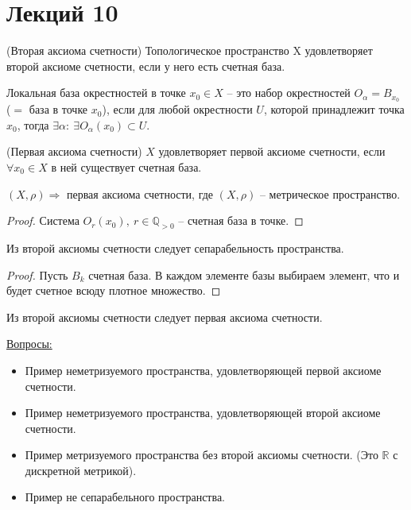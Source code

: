 \section{Лекций 10}

\begin{definition}
    (Вторая аксиома счетности) Топологическое пространство X удовлетворяет второй аксиоме счетности, если у него есть счетная база.
\end{definition}

\begin{definition}
    Локальная база окрестностей в точке $x_0 \in X$ -- это набор окрестностей $O_\alpha = B_{x_0}$ ($=$ база в точке $x_0$), если для любой окрестности $U$, которой принадлежит точка $x_0$, тогда $\exists \alpha:\ \exists O_\alpha(x_0) \subset U$.  
\end{definition}

\begin{definition}
    (Первая аксиома счетности) $X$ удовлетворяет первой аксиоме счетности, если $\forall x_0 \in X$ в ней существует счетная база.
\end{definition}

\begin{statement}
    $(X, \rho) \Rightarrow$ первая аксиома счетности, где $(X, \rho)$ -- метрическое пространство. 
\end{statement}
\begin{proof}
    Система $O_r(x_0),\ r \in \mathbb{Q}_{>0}$ -- счетная база в точке. 
\end{proof}

\begin{statement}
    Из второй аксиомы счетности следует сепарабельность пространства.
\end{statement}
\begin{proof}
    Пусть $B_k$ счетная база. В каждом элементе базы выбираем элемент, что и будет счетное всюду плотное множество. 
\end{proof}

\begin{statement}
    Из второй аксиомы счетности следует первая аксиома счетности.
\end{statement}

\underline{Вопросы:}
\begin{itemize}
    \item Пример неметризуемого пространства, удовлетворяющей первой аксиоме счетности.
    \item Пример неметризуемого пространства, удовлетворяющей второй аксиоме счетности.
    \item Пример метризуемого пространства без второй аксиомы счетности. (Это $\mathbb{R}$ с дискретной метрикой).
    \item Пример не сепарабельного пространства.
\end{itemize}

